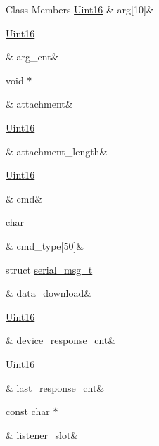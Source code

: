 \begin{DoxyFields}{Class Members}
\hypertarget{a00001_a56e6c2d7315d0ae60a51e8b140c9cfe4}{\hyperlink{a00001_aae7407b021d43f7193a81a58cfb3e297}{Uint16}}\label{a00001_a56e6c2d7315d0ae60a51e8b140c9cfe4}
&
arg\mbox{[}10\mbox{]}&
\\
\hline

\hypertarget{a00001_affcea772a1bc5362ebbc274b6166f81b}{\hyperlink{a00001_aae7407b021d43f7193a81a58cfb3e297}{Uint16}}\label{a00001_affcea772a1bc5362ebbc274b6166f81b}
&
arg\+\_\+cnt&
\\
\hline

\hypertarget{a00001_a0b844fe783d7e252159a9641b949e83c}{void $\ast$}\label{a00001_a0b844fe783d7e252159a9641b949e83c}
&
attachment&
\\
\hline

\hypertarget{a00001_ae5afad7c81dab7d9ab6587251aafdbf4}{\hyperlink{a00001_aae7407b021d43f7193a81a58cfb3e297}{Uint16}}\label{a00001_ae5afad7c81dab7d9ab6587251aafdbf4}
&
attachment\+\_\+length&
\\
\hline

\hypertarget{a00001_af20664dc9ca2b752c73d524edee0e07a}{\hyperlink{a00001_aae7407b021d43f7193a81a58cfb3e297}{Uint16}}\label{a00001_af20664dc9ca2b752c73d524edee0e07a}
&
cmd&
\\
\hline

\hypertarget{a00001_a217dc0db956d3bb46d8573960cb7359a}{char}\label{a00001_a217dc0db956d3bb46d8573960cb7359a}
&
cmd\+\_\+type\mbox{[}50\mbox{]}&
\\
\hline

\hypertarget{a00001_a5cfeaed4d4f8e51070a324c0ba893ebe}{struct \hyperlink{a00001_de/d36/a00123}{serial\+\_\+msg\+\_\+t}}\label{a00001_a5cfeaed4d4f8e51070a324c0ba893ebe}
&
data\+\_\+download&
\\
\hline

\hypertarget{a00001_a2b37e66e2555cf1dc26439ad7c30ea78}{\hyperlink{a00001_aae7407b021d43f7193a81a58cfb3e297}{Uint16}}\label{a00001_a2b37e66e2555cf1dc26439ad7c30ea78}
&
device\+\_\+response\+\_\+cnt&
\\
\hline

\hypertarget{a00001_a44be27a056581b6e706ec1ab28ce46e0}{\hyperlink{a00001_aae7407b021d43f7193a81a58cfb3e297}{Uint16}}\label{a00001_a44be27a056581b6e706ec1ab28ce46e0}
&
last\+\_\+response\+\_\+cnt&
\\
\hline

\hypertarget{a00001_abb76d8edb39876deb60975c8fd784b3f}{const char $\ast$}\label{a00001_abb76d8edb39876deb60975c8fd784b3f}
&
listener\+\_\+slot&
\\
\hline


\end{DoxyFields}
